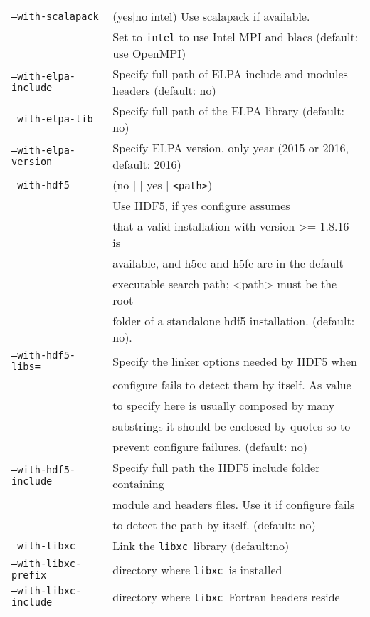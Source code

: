 \documentclass[12pt,a4paper]{article}
\def\libxc{\texttt{libxc}}
\begin{document}
\begin{tabular}{ll}
\texttt{--with-scalapack}&        (yes$|$no$|$intel) Use scalapack if available. \\
      &Set to \texttt{intel} to use Intel MPI and blacs (default: use OpenMPI)\\
\texttt{--with-elpa-include}&   Specify full path of ELPA include and modules
  headers (default: no)\\
\texttt{--with-elpa-lib}& Specify full path of the ELPA library
	                          (default: no)\\
\texttt{--with-elpa-version}& Specify ELPA version, only year (2015 or 2016,
	                          default: 2016)\\
\texttt{--with-hdf5}&  (no $|$ $|$ yes $|$ \texttt{<path>}) \\
	                    & Use HDF5, if yes configure assumes    \\
                            & that a valid installation with version >= 1.8.16 is \\
                            & available, and h5cc and h5fc are in the default   \\ 
                            & executable search path; <path> must be the root   \\ 
                            & folder of a standalone hdf5 installation. (default: no). \\
\texttt{--with-hdf5-libs=}  & Specify the linker options needed by HDF5 when  \\
                            & configure fails to detect them by itself. As value \\ 
                            & to specify here is usually composed by many \\ 
                            & substrings it should be enclosed by quotes so to \\
                            & prevent configure failures. (default: no)   \\
\texttt{--with-hdf5-include}& Specify full path the HDF5 include folder containing \\
                            & module and headers files. Use it if configure fails \\ 
                            & to detect the path by itself. (default: no)\\ 
\texttt{--with-libxc}        & Link the \libxc\ library (default:no) \\
\texttt{--with-libxc-prefix} & directory where \libxc\ is installed \\
\texttt{--with-libxc-include}& directory where \libxc\ Fortran headers reside\\
\end{tabular}\\
\end{document}
